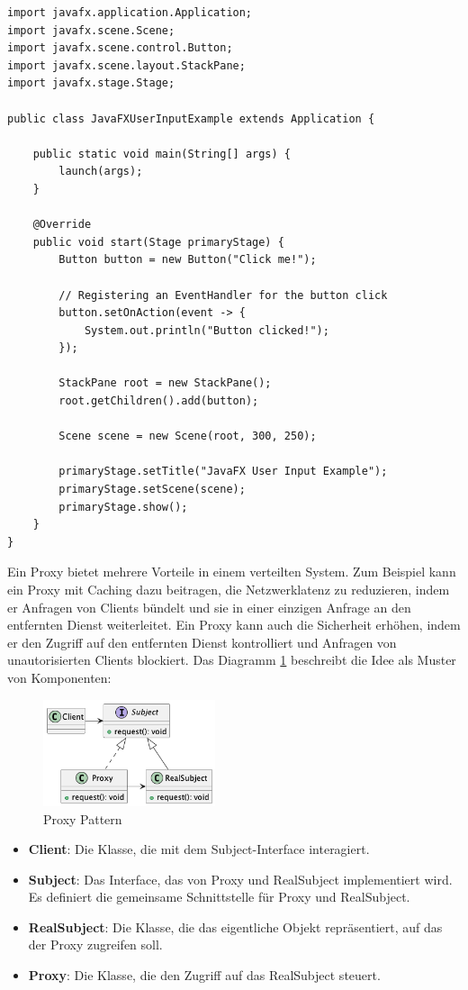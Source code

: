 \documentclass[../vs-script-first-v01.tex]{subfiles}
\begin{document}
\noindent\begin{minipage}{\textwidth}
\begin{lstlisting}[caption={Java FX Input},captionpos=b,label={lst:javafx-input}]
import javafx.application.Application;
import javafx.scene.Scene;
import javafx.scene.control.Button;
import javafx.scene.layout.StackPane;
import javafx.stage.Stage;

public class JavaFXUserInputExample extends Application {

    public static void main(String[] args) {
        launch(args);
    }

    @Override
    public void start(Stage primaryStage) {
        Button button = new Button("Click me!");

        // Registering an EventHandler for the button click
        button.setOnAction(event -> {
            System.out.println("Button clicked!");
        });

        StackPane root = new StackPane();
        root.getChildren().add(button);

        Scene scene = new Scene(root, 300, 250);

        primaryStage.setTitle("JavaFX User Input Example");
        primaryStage.setScene(scene);
        primaryStage.show();
    }
}
\end{lstlisting}
\end{minipage}

Ein Proxy bietet mehrere Vorteile in einem verteilten System. Zum Beispiel kann ein Proxy mit Caching dazu beitragen, die Netzwerklatenz zu reduzieren, indem er Anfragen von Clients bündelt und sie in einer einzigen Anfrage an den entfernten Dienst weiterleitet. Ein Proxy kann auch die Sicherheit erhöhen, indem er den Zugriff auf den entfernten Dienst kontrolliert und Anfragen von unautorisierten Clients blockiert. Das Diagramm \ref{fig:proxy} beschreibt die Idee als Muster von Komponenten:
\begin{figure}[ht]
  \centering
  \includegraphics[width=0.45\textwidth]{fig/uml/proxy.png}
  \caption{Proxy Pattern}
  \label{fig:proxy}
\end{figure}
\begin{itemize}
\item \textbf{Client}: Die Klasse, die mit dem Subject-Interface interagiert.
\item \textbf{Subject}: Das Interface, das von Proxy und RealSubject implementiert wird. Es definiert die gemeinsame Schnittstelle für Proxy und RealSubject.
\item \textbf{RealSubject}: Die Klasse, die das eigentliche Objekt repräsentiert, auf das der Proxy zugreifen soll.
\item \textbf{Proxy}: Die Klasse, die den Zugriff auf das RealSubject steuert.
\end{itemize}
\end{document}
